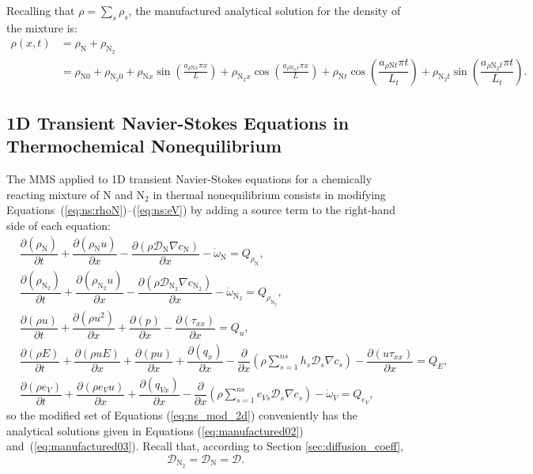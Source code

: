 \documentclass[10pt]{article}
\newcommand{\Diff}[2] {\dfrac{\partial( #1)}{\partial #2}}
\newcommand{\diff}[2] {\dfrac{\partial #1 }{\partial #2}}
\newcommand{\N}{\text{N}}
\begin{document}
Recalling that $\rho=\sum_s \rho_s$, the manufactured analytical solution for the density of the mixture  is:
\begin{equation}
\label{eq:manufactured03}
\begin{split}
\rho(x,t) &= \rho_{\text{N}}+\rho_{\text{N}_2}\\
                     &= \rho_{\text{N}0} + \rho_{\text{N}_2 0} +
\rho_{\text{N}x} \sin\left(\frac{a_{  \rho \text{N} x }\pi x}{L}\right) + \rho_{\text{N}_2 x} \cos\left(\frac{a_{ \rho \text{N}_2 x } \pi x}{L}\right)+\rho_{\text{N}t} \cos\left( \dfrac{ a_{ \rho \text{N} t}  \pi t}{L_t}\right)+\rho_{\text{N}_2 t} \sin\left( \dfrac{ a_{ \rho \text{N}_2 t}\pi t}{L_t}\right) .
\end{split}
\end{equation}




\subsection{1D Transient Navier-Stokes Equations in Thermochemical Nonequilibrium}

The MMS applied to 1D transient Navier-Stokes equations for a chemically reacting mixture of  N and N$_{2}$ in thermal nonequilibrium consists in modifying  Equations~(\ref{eq:ns:rhoN})--(\ref{eq:ns:eV}) by adding a source term to the right-hand side of each equation:
\begin{equation}
 \label{eq:ns_mod_2d}
\begin{split}
&\Diff{\rho_{\N}}{t} +\Diff{\rho_{\N} u}{x} -\diff{ \left(\rho \mathcal{D}_{\N} \nabla c_{\N} \right)}{x} - \dot{\omega}_{\text{N}}= Q_{\rho_{\N}},\\
&\Diff{\rho_{\N_2}}{t} +\Diff{\rho_{\N_2} u}{x} -\diff{ \left(\rho \mathcal{D}_{\N_2} \nabla c_{\N_2} \right)}{x} - \dot{\omega}_{\text{N}_2}= Q_{\rho_{\N_2}},\\
&\Diff{\rho u}{t} + \Diff{\rho u^2 }{x}+ \Diff{p}{x} -\Diff{\tau_{xx}}{x}= Q_u,\\
&\Diff{\rho E}{t} +\Diff{\rho uE}{x}+ \Diff{pu}{x}+ \Diff{q_x}{x}-\diff{ }{x}\left(\rho \sum_{s=1}^{ns} h_s \mathcal{D}_s \nabla c_s\right)-\Diff{u\tau_{xx}}{x} = Q_{E},\\
& \Diff{\rho e_V}{t}+ \Diff{\rho e_V u }{x}+ \Diff{q_{Vx}}{x}-\diff{ }{x}\left(\rho \sum_{s=1}^{ns} e_{Vs} \mathcal{D}_s \nabla{c_s}\right)-\dot{\omega}_V =Q_{e_V},
\end{split}
\end{equation}
%
so the modified set of Equations (\ref{eq:ns_mod_2d}) conveniently has the analytical solutions given in Equations (\ref{eq:manufactured02}) and~(\ref{eq:manufactured03}). Recall that, according to Section \ref{sec:diffusion_coeff}, $$\mathcal{D}_{\N_2} =\mathcal{D}_{\N} =\mathcal{D}.$$
%
\end{document}
